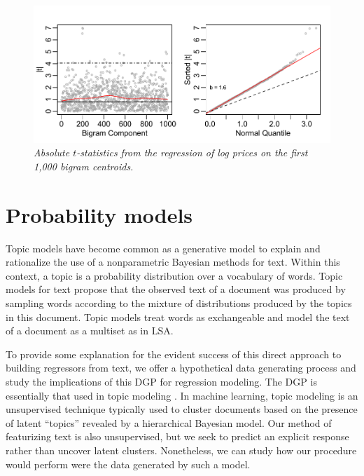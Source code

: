 \documentclass[12pt]{article}
\begin{document}
 
\begin{figure}
\caption{  \label{fig:bigramtstats}  
  {\sl Absolute $t$-statistics from the regression of log prices on the first 1,000 bigram centroids.}  }
  \centerline{ \includegraphics[width=5in]{figures/bigram_tstats.pdf} }
\end{figure}


\section{Probability models}
\label{sec:topic}

Topic models have become common as a generative model to explain and rationalize the use of a nonparametric Bayesian methods for text.  Within this context, a topic is a probability distribution over a vocabulary of words.  Topic models for text propose that the observed text of a document was produced by sampling words according to the mixture of distributions produced by the topics in this document. Topic models treat words as exchangeable and model the text of a document as a multiset as in LSA.

To provide some explanation for the evident success of this direct approach to building regressors from text, we offer a hypothetical data generating process and study the implications of this DGP for regression modeling.  The DGP is essentially that used in topic modeling \citep{blei12}.  In machine learning, topic modeling is an unsupervised technique typically used to cluster documents based on the presence of latent ``topics'' revealed by a hierarchical Bayesian  model.  Our method of featurizing text is also unsupervised,  but we seek to predict an explicit response rather than uncover latent clusters.  Nonetheless, we can study how our procedure would perform were the data generated by such a model.
 
\end{document}
